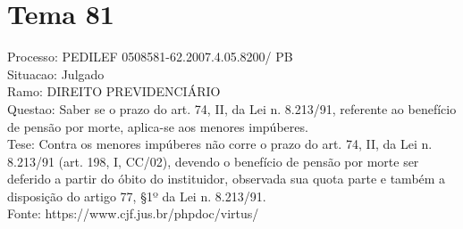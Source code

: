 \documentclass[12pt]{article}
\begin{document}
\section*{Tema 81}
Processo: PEDILEF 0508581-62.2007.4.05.8200/ PB\\
Situacao: Julgado\\
Ramo: DIREITO PREVIDENCIÁRIO\\
Questao: Saber se o prazo do art. 74, II, da Lei n. 8.213/91, referente ao benefício de pensão por morte, aplica-se aos menores impúberes.\\
Tese: Contra os menores impúberes não corre o prazo do art. 74, II, da Lei n. 8.213/91 (art. 198, I, CC/02), devendo o benefício de pensão por morte ser deferido a partir do óbito do instituidor, observada sua quota parte e também a disposição do artigo 77, §1º da Lei n. 8.213/91.\\
Fonte: https://www.cjf.jus.br/phpdoc/virtus/
\end{document}
